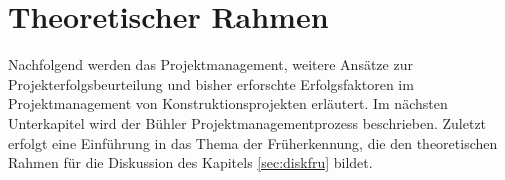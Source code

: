 \chapter{Theoretischer Rahmen}\label{sec:theor}
Nachfolgend werden das Projektmanagement, weitere Ansätze zur Projekterfolgsbeurteilung und bisher erforschte Erfolgsfaktoren im Projektmanagement von Konstruktionsprojekten erläutert. Im nächsten Unterkapitel wird der Bühler Projektmanagementprozess beschrieben. Zuletzt erfolgt eine Einführung in das Thema der Früherkennung, die den theoretischen Rahmen für die Diskussion des Kapitels \ref{sec:diskfru} bildet.
